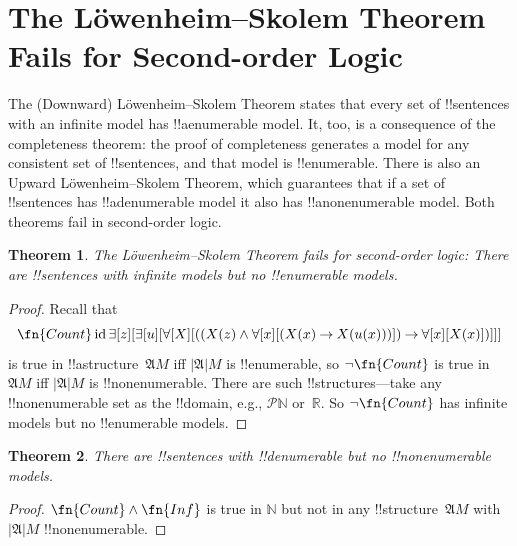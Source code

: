 \documentclass[10pt,a4paper]{article}
\theoremstyle{plain}
\newtheorem{thm}{Theorem}[section]
\theoremstyle{definition}
\theoremstyle{remark}
\newenvironment{explain}{}{}
\newcommand*{\olfileid}[3]{}
\newcommand*{\olsection}[1]{\section*{#1}}
\newcommand*{\olchapter}[3]{}
\newcommand*{\ollabel}[1]{\label{#1}}
\providecommand{\lif}{\mathbin{\rightarrow}}
\providecommand{\lforall}{\mathord{\forall}}
\providecommand{\lexists}{\mathord{\exists}}
\providecommand{\Struct}{\ensuremath{\mathfrak{A}}}
\providecommand{\Domain}{\ensuremath{|\mathfrak{A}|}}
\providecommand{\Nat}{\ensuremath{\mathbb{N}}}
\providecommand{\Real}{\mathbb{R}}
\providecommand{\Pow}{\mathcal{P}}
\providecommand{\ident}{\operatorname{id}}
\begin{document}
\olfileid{sol}{met}{lst}

\olsection{The L\"owenheim--Skolem Theorem Fails for Second-order Logic}

\begin{explain}
The (Downward) L\"owenheim--Skolem Theorem states that every set of
!!{sentence}s with an infinite model has !!a{enumerable} model.  It,
too, is a consequence of the completeness theorem: the proof of
completeness generates a model for any consistent set of
!!{sentence}s, and that model is !!{enumerable}.  There is also an
Upward L\"owenheim--Skolem Theorem, which guarantees that if a set of
!!{sentence}s has !!a{denumerable} model it also has
!!a{nonenumerable} model.  Both theorems fail in second-order logic.
\end{explain}


\begin{thm}
\ollabel{thm:sol-no-ls} The L\"owenheim--Skolem Theorem fails for
second-order logic: There are !!{sentence}s with infinite models but
no !!{enumerable} models.
\end{thm}

\begin{proof}
Recall that 
\[
\fn{Count} \ident \lexists[z][\lexists[u][\lforall[X][((X(z) \land
      \lforall[x][(X(x) \lif X(u(x)))]) \lif \lforall[x][X(x)])]]]
\]
is true in !!a{structure}~$\Struct{M}$ iff $\Domain{M}$ is
!!{enumerable}, so $\lnot\fn{Count}$ is true in~$\Struct{M}$
iff $\Domain{M}$ is !!{nonenumerable}.  There are
such !!{structure}s---take any !!{nonenumerable} set as the
!!{domain}, e.g., $\Pow{\Nat}$ or~$\Real$. So $\lnot \fn{Count}$ 
has infinite models but no !!{enumerable} models.
\end{proof}

\begin{thm}
There are !!{sentence}s with !!{denumerable} but no
!!{nonenumerable} models.
\end{thm}

\begin{proof}
$\fn{Count} \land \fn{Inf}$ is true in $\Nat$ but not in any
  !!{structure}~$\Struct{M}$ with $\Domain{M}$ !!{nonenumerable}.
\end{proof}






\olchapter{sol}{met}{Metatheory of Second-order Logic}
\end{document}
